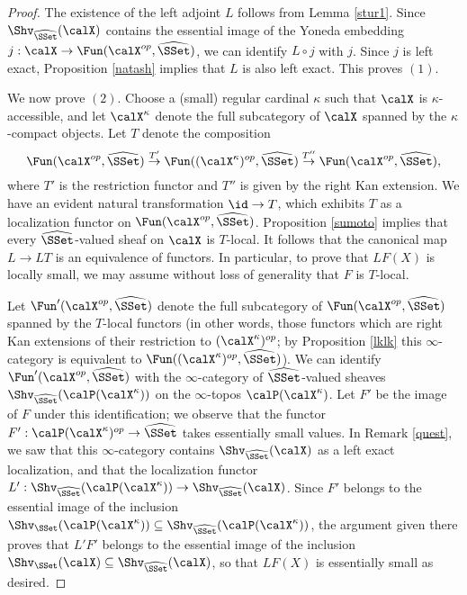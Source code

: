 \begin{proof}
The existence of the left adjoint $L$ follows from Lemma \ref{stur1}. Since
$\Shv_{ \widehat{\SSet}}(\calX)$ contains the essential image of the Yoneda embedding
$j: \calX \rightarrow \Fun( \calX^{op}, \widehat{\SSet})$, we can identify $L \circ j$ with $j$.
Since $j$ is left exact, Proposition \ref{natash} implies that $L$ is also left exact. This proves $(1)$.

We now prove $(2)$. Choose a (small) regular cardinal $\kappa$ such that $\calX$ is $\kappa$-accessible, and let $\calX^{\kappa}$ denote the full subcategory of $\calX$ spanned by the $\kappa$-compact objects. Let $T$ denote the composition
$$ \Fun( \calX^{op}, \widehat{\SSet}) \stackrel{T'}{\rightarrow}
\Fun( (\calX^{\kappa})^{op}, \widehat{\SSet}) \stackrel{T''}{\rightarrow} \Fun( \calX^{op}, \widehat{\SSet}),$$ where $T'$ is the restriction functor and $T''$ is given by the right Kan extension. We have an evident natural transformation $\id \rightarrow T$, which exhibits $T$ as a localization functor
on $\Fun( \calX^{op}, \widehat{\SSet})$. Proposition \ref{sumoto} implies that
every $\widehat{\SSet}$-valued sheaf on $\calX$ is $T$-local. It follows that the canonical map
$L \rightarrow LT$ is an equivalence of functors. In particular, to prove that $LF(X)$ is locally small, 
we may assume without loss of generality that $F$ is $T$-local.

Let $\Fun'( \calX^{op}, \widehat{\SSet})$ denote the full subcategory of $\Fun(\calX^{op}, \widehat{\SSet})$ spanned by the $T$-local functors (in other words, those functors which are right Kan extensions of their restriction to $(\calX^{\kappa})^{op}$; by Proposition \ref{lklk} this
$\infty$-category is equivalent to $\Fun( (\calX^{\kappa})^{op}, \widehat{\SSet} )$). We can identify
$\Fun'( \calX^{op}, \widehat{\SSet} )$ with the $\infty$-category of $\widehat{\SSet}$-valued sheaves
$\Shv_{ \widehat{\SSet}}( \calP( \calX^{\kappa}) )$ on the $\infty$-topos $\calP( \calX^{\kappa})$. Let $F'$
be the image of $F$ under this identification; we observe that the functor
$F': \calP( \calX^{\kappa})^{op} \rightarrow \widehat{\SSet}$ takes essentially small values.
In Remark \ref{quest}, we saw that this $\infty$-category contains $\Shv_{\widehat{\SSet}}( \calX)$ as a left exact localization, and that the localization functor $L': \Shv_{\widehat{\SSet}}(\calP(\calX^{\kappa})) \rightarrow \Shv_{\widehat{\SSet}}( \calX)$. Since $F'$ belongs to the essential image of
the inclusion $\Shv_{ \SSet}( \calP(\calX^{\kappa})) \subseteq \Shv_{ \widehat{\SSet}}( \calP( \calX^{\kappa}))$, the argument given there proves that $L'F'$ belongs to the essential image of
the inclusion $\Shv_{\SSet}(\calX) \subseteq \Shv_{ \widehat{\SSet}}(\calX)$, so that
$LF(X)$ is essentially small as desired.


\end{proof}
